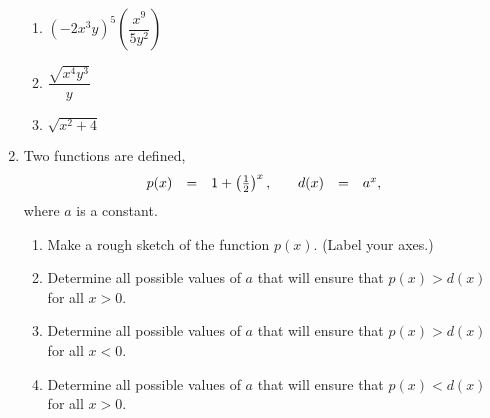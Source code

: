 \begin{enumerate}
\begin{enumerate}
\item $\left(-2x^3y\right)^5 \left(\dfrac{x^9}{5y^2}\right)$

  \vfill

\item $\dfrac{\sqrt{x^4y^3}}{y}$

  \vfill

\item $\sqrt{x^2+4}$

  \vfill

\end{enumerate}


\clearpage

\item Two functions are defined,
  \begin{equation*}
    \begin{array}{rcl@{\hspace{2em}}rcl}
      p(x) & = & 1 + \left(\frac{1}{2}\right)^x, & d(x) & = & a^x,
    \end{array}
  \end{equation*}
  where $a$ is a constant.
  \begin{enumerate}
  \item Make a rough sketch of the function $p(x)$. (Label your axes.)
    \vfill
  \item Determine all possible values of $a$ that will ensure that
    $p(x)>d(x)$ for all $x>0$.
    \vfill
  \item Determine all possible values of $a$ that will ensure that
    $p(x)>d(x)$ for all $x<0$.
    \vfill
  \item Determine all possible values of $a$ that will ensure that
    $p(x)<d(x)$ for all $x>0$.
    \vfill
  \end{enumerate}



\end{enumerate}



